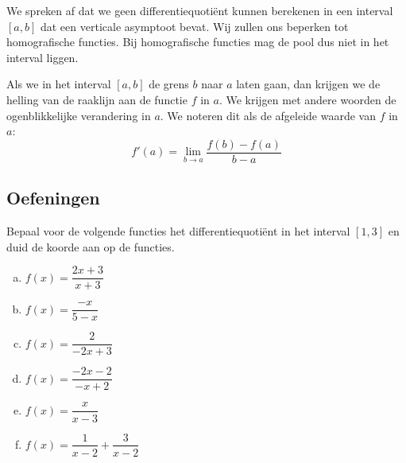 \documentclass[12pt]{article}
\begin{document}
\begin{theorie}
We spreken af dat we geen differentiequotiënt kunnen berekenen in een interval $[a,b]$ dat een verticale asymptoot bevat. Wij zullen ons beperken tot homografische functies. Bij homografische functies mag de pool dus niet in het interval liggen.

Als we in het interval $[a,b]$ de grens $b$ naar $a$ laten gaan, dan krijgen we de helling van de raaklijn aan de functie $f$ in $a$. We krijgen met andere woorden de ogenblikkelijke verandering in $a$. We noteren dit als de afgeleide waarde van $f$ in $a$:
$$f'(a)=\lim_{b\to a}\dfrac{f(b)-f(a)}{b-a}$$

\pagebreak
\subsection{Oefeningen}

\end{theorie}

\begin{oefening}
Bepaal voor de volgende functies het differentiequotiënt in het interval $[1,3]$ en duid de koorde aan op de functies.
\begin{multicols}{2}
\begin{enumerate}[(a)]
  \itemsep1em
  \item $f(x)=\dfrac{2x+3}{x+3}$
  \item $f(x)=\dfrac{-x}{5-x}$
  \item $f(x)=\dfrac{2}{-2x+3}$
  \item $f(x)=\dfrac{-2x-2}{-x+2}$
  \item $f(x)=\dfrac{x}{x-3}$
  \item $f(x)=\dfrac{1}{x-2}+\dfrac{3}{x-2}$
\end{enumerate}
\end{multicols}
\end{oefening}
\end{document}
